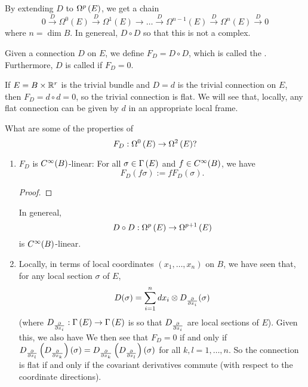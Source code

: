 \documentclass[main.tex]{subfiles}
\begin{document}
By extending $D$ to $\Omega^{p}\left( E \right)$, we get a chain
\[
  0 \overset{D}{\to} \Omega^0(E) \overset{D}{\to}  \Omega^1(E) \to  \dots \overset{D}{\to}  \Omega^{n-1}(E) \overset{D}{\to}  \Omega^n(E) \overset{D}{\to} 0
\]
where $n = \dim B$. In genereal, $D \circ D$ so that this is not a complex.

\begin{defn}
  Given a connection $D$ on $E$, we define $F_D = D \circ D$, which is called the . Furthermore, $D$ is called  if $F_D = 0$.
\end{defn}

\begin{exmp}
  If $E = B \times \mathbb{R}^r$ is the trivial bundle and $D=d$ is the trivial connection on $E$, then $F_D = d \circ d = 0$, so the trivial connection is flat. We will see that, locally, any flat connection can be given by $d$ in an appropriate local frame.
\end{exmp}

What are some of the properties of
\[
F_D: \Omega^{0}\left( E \right) \to \Omega^{2}\left( E \right)?
\]
\begin{enumerate}[1)]
  \item $F_D$ is $C^\infty(B)$-linear: For all $\sigma \in \Gamma\left( E \right)$ and $f \in C^\infty(B)$, we have
  \[
  F_D(f\sigma) := fF_D(\sigma).
  \]
  \begin{proof}
  \end{proof}
    In genereal,
    \[
    D \circ D : \Omega^{p}\left( E \right) \to \Omega^{p+1}\left( E \right)
    \] is $C^\infty(B)$-linear.

    \item Locally, in terms of local coordinates $(x_1, \dots, x_n)$ on $B$, we have seen that, for any local section $\sigma$ of $E$,
\[
D(\sigma) = \sum_{i=1}^n dx_i \otimes D_{\frac{ \partial  }{ \partial x_i }}(\sigma)
\]
(where $D_{\frac{ \partial  }{ \partial x_i }}: \Gamma\left( E \right) \to \Gamma\left( E \right)$ is so that $D_{\frac{ \partial  }{ \partial x_i }}$ are local sections of $E$). Given this, we also have
We then see that $F_D  = 0$ if and only if $D_{\frac{ \partial  }{ \partial x_l }}\left(  D_{\frac{ \partial  }{ \partial x_k }}  \right)(\sigma) = D_{\frac{ \partial  }{ \partial x_k }}\left(  D_{\frac{ \partial  }{ \partial x_l }}  \right)(\sigma)$ for all $k,l = 1, \dots, n$. So the connection is flat if and only if the covariant derivatives commute (with respect to the coordinate directions).
\end{enumerate}
\end{document}
